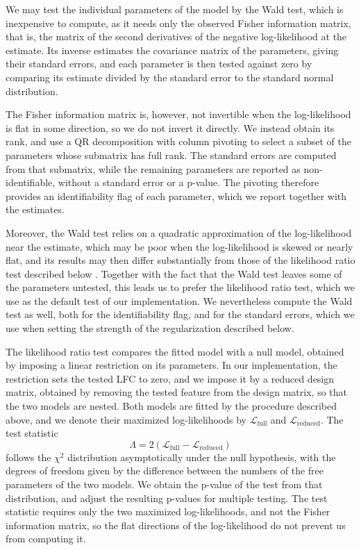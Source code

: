 \documentclass[11pt]{article}
\begin{document}
	We may test the individual parameters of the model by the Wald test, which is inexpensive to compute, as it needs only the observed Fisher information matrix, that is, the matrix of the second derivatives of the negative log-likelihood at the estimate. Its inverse estimates the covariance matrix of the parameters, giving their standard errors, and each parameter is then tested against zero by comparing its estimate divided by the standard error to the standard normal distribution.

	The Fisher information matrix is, however, not invertible when the log-likelihood is flat in some direction, so we do not invert it directly. We instead obtain its rank, and use a QR decomposition with column pivoting to select a subset of the parameters whose submatrix has full rank. The standard errors are computed from that submatrix, while the remaining parameters are reported as non-identifiable, without a standard error or a p-value. The pivoting therefore provides an identifiability flag of each parameter, which we report together with the estimates.

	Moreover, the Wald test relies on a quadratic approximation of the log-likelihood near the estimate, which may be poor when the log-likelihood is skewed or nearly flat, and its results may then differ substantially from those of the likelihood ratio test described below \citep{hauckWaldsTestApplied1977}. Together with the fact that the Wald test leaves some of the parameters untested, this leads us to prefer the likelihood ratio test, which we use as the default test of our implementation. We nevertheless compute the Wald test as well, both for the identifiability flag, and for the standard errors, which we use when setting the strength of the regularization described below.

	The likelihood ratio test compares the fitted model with a null model, obtained by imposing a linear restriction on its parameters. In our implementation, the restriction sets the tested LFC to zero, and we impose it by a reduced design matrix, obtained by removing the tested feature from the design matrix, so that the two models are nested. Both models are fitted by the procedure described above, and we denote their maximized log-likelihoods by $\mathcal{L}_{\mathrm{full}}$ and $\mathcal{L}_{\mathrm{reduced}}$. The test statistic
	\begin{equation} \label{eq:lrt_statistic}
		\Lambda = 2 \left( \mathcal{L}_{\mathrm{full}} - \mathcal{L}_{\mathrm{reduced}} \right)
	\end{equation}
	follows the $\chi^2$ distribution asymptotically under the null hypothesis, with the degrees of freedom given by the difference between the numbers of the free parameters of the two models. We obtain the p-value of the test from that distribution, and adjust the resulting p-values for multiple testing. The test statistic requires only the two maximized log-likelihoods, and not the Fisher information matrix, so the flat directions of the log-likelihood do not prevent us from computing it.
\end{document}
